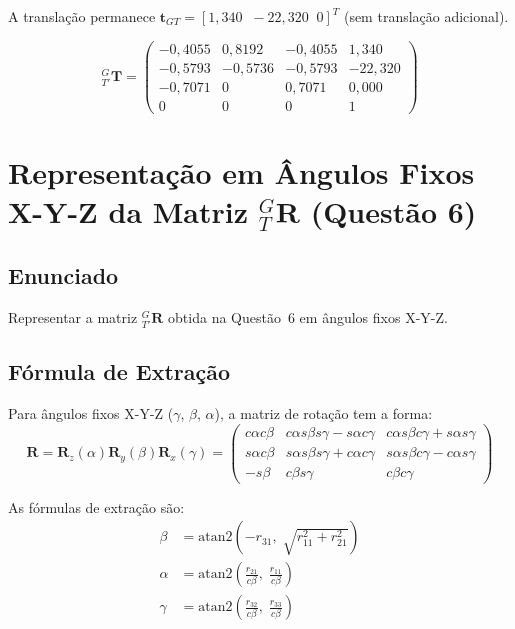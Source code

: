 \documentclass[12pt,a4paper]{article}
\newcommand{\Trans}[2]{{}^{#1}_{#2}\!\mathbf{T}}
\newcommand{\Rx}[1]{\mathbf{R}_x(#1)}
\newcommand{\Ry}[1]{\mathbf{R}_y(#1)}
\newcommand{\Rz}[1]{\mathbf{R}_z(#1)}
\begin{document}
A translação permanece $\mathbf{t}_{GT} = [1{,}340\;\;{-}22{,}320\;\;0]^T$ (sem translação adicional).

\begin{tcolorbox}[resultbox]
\[
\Trans{G}{T'} =
\begin{pmatrix}
 -0{,}4055 &  0{,}8192 & -0{,}4055 &   1{,}340 \\
 -0{,}5793 & -0{,}5736 & -0{,}5793 & -22{,}320 \\
 -0{,}7071 &  0        &  0{,}7071 &   0{,}000 \\
  0        &  0        &  0        &   1
\end{pmatrix}
\]
\end{tcolorbox}

\newpage

\section{Representação em Ângulos Fixos X-Y-Z da Matriz ${}^{G}_{T}\mathbf{R}$ (Questão 6)}

\subsection*{Enunciado}
Representar a matriz ${}^{G}_{T'}\mathbf{R}$ obtida na Questão~6 em ângulos fixos X-Y-Z.

\subsection{Fórmula de Extração}

Para ângulos fixos X-Y-Z ($\gamma$, $\beta$, $\alpha$), a matriz de rotação tem a forma:
\[
  \mathbf{R} = \Rz{\alpha}\Ry{\beta}\Rx{\gamma} =
  \begin{pmatrix}
    c\alpha c\beta & c\alpha s\beta s\gamma - s\alpha c\gamma & c\alpha s\beta c\gamma + s\alpha s\gamma \\
    s\alpha c\beta & s\alpha s\beta s\gamma + c\alpha c\gamma & s\alpha s\beta c\gamma - c\alpha s\gamma \\
    -s\beta        & c\beta s\gamma                           & c\beta c\gamma
  \end{pmatrix}
\]

As fórmulas de extração são:
\begin{align}
  \beta  &= \mathrm{atan2}\!\left(-r_{31},\;\sqrt{r_{11}^2+r_{21}^2}\right) \label{eq:beta}\\
  \alpha &= \mathrm{atan2}\!\left(\frac{r_{21}}{c\beta},\;\frac{r_{11}}{c\beta}\right) \label{eq:alpha}\\
  \gamma &= \mathrm{atan2}\!\left(\frac{r_{32}}{c\beta},\;\frac{r_{33}}{c\beta}\right) \label{eq:gamma}
\end{align}
\end{document}

